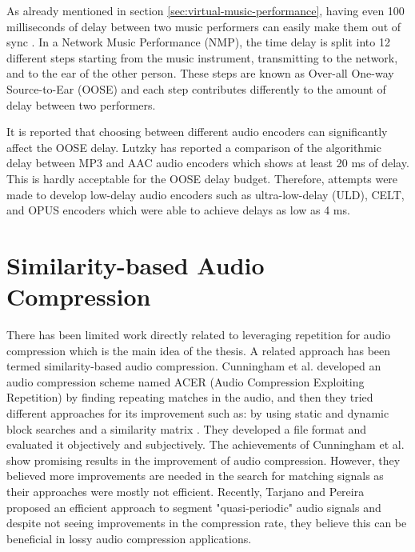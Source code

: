 As already mentioned in section \ref{sec:virtual-music-performance}, having even 100 milliseconds of delay between two music performers can easily make them out of sync \cite{chafe2004effect,bartlette2006effect}. In a Network Music Performance (NMP), the time delay is split into 12 different steps starting from the music instrument, transmitting to the network, and to the ear of the other person. These steps are known as Over-all One-way Source-to-Ear (OOSE) and each step contributes differently to the amount of delay between two performers\cite{carot2009fundamentals, rottondi2016overview}.

It is reported that choosing between different audio encoders can significantly affect the OOSE delay. Lutzky has reported a comparison of the algorithmic delay between MP3 and AAC audio encoders which shows at least 20 ms of delay\cite{lutzky2004guideline}. This is hardly acceptable for the OOSE delay budget. Therefore, attempts were made to develop low-delay audio encoders such as ultra-low-delay (ULD)\cite{schuller2002perceptual}, CELT\cite{valin2009full}, and OPUS\cite{valin2016high} encoders which were able to achieve delays as low as 4 ms. 



\section{Similarity-based Audio Compression}

There has been limited work directly 
related to leveraging repetition for audio compression which is the main idea of the thesis. A related approach has been termed similarity-based audio compression. Cunningham et al. developed an audio compression scheme named ACER (Audio Compression Exploiting Repetition) by finding repeating matches in the audio\cite{cunningham2005play}, and then they tried different approaches for its improvement such as: by using static and dynamic block searches\cite{cunningham2007advances} and a similarity matrix \cite{cunningham2014data}. They developed a file format\cite{cunningham2009audio} and evaluated it objectively and subjectively\cite{cunningham2013initial,cunningham2019subjective}. The achievements of Cunningham et al. show promising results in the improvement of audio compression. However, they believed more improvements are needed in the search for matching signals as their approaches were mostly not efficient. Recently, Tarjano and Pereira proposed an efficient approach to segment "quasi-periodic" audio signals and despite not seeing improvements in the compression rate, they believe this can be beneficial in lossy audio compression applications\cite{tarjano2022efficient}.